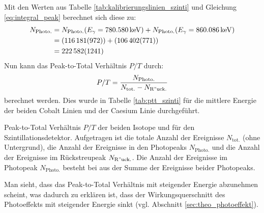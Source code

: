 \documentclass[11pt, a4paper]{article}
\numberwithin{equation}{section}
\newcommand{\co}{\isotope[60]{Co}}
\newcommand{\cs}{\isotope[137]{Cs}}
\begin{document}
Mit den Werten aus Tabelle \ref{tab:kalibrierungslinien_szinti} und Gleichung \eqref{eq:integral_peak} berechnet sich diese zu:
\begin{align*}
	N_\mathrm{Photo.} &= N_\mathrm{Photo.}(E_\gamma = \SI{780.580}{\kilo\electronvolt}) +  N_\mathrm{Photo.}(E_\gamma = \SI{860.086}{\kilo\electronvolt})\\
	&= (\num{116181 +- 972}) + (\num{106402 +- 771})\\
	&= \num{222582 +- 1241}
\end{align*}
Nun kann das Peak-to-Total Verhältnis $P/T$ durch:
\begin{align}
	\label{eq:ptt}
	P/T = \frac{N_\mathrm{Photo.}}{N_\mathrm{tot.} - N_\mathrm{R"uck.}}
\end{align}
berechnet werden.
Dies wurde in Tabelle \ref{tab:ptt_szinti} für die mittlere Energie der beiden Cobalt Linien und der Caesium Linie durchgeführt.
\begin{table}[ht]
	\centering
	\resizebox{\textwidth}{!}{
	
	}
	\caption{Peak-to-Total Verhältnis $P/T$ der beiden Isotope \co{} und \cs{} für den Szintillationsdetektor. Aufgetragen ist die totale Anzahl der Ereignisse $N_\mathrm{tot.}$ (ohne Untergrund), die Anzahl der Ereignisse in den Photopeaks $N_\mathrm{Photo.}$ und die Anzahl der Ereignisse im Rückstreupeak $N_\mathrm{R"uck.}$. Die Anzahl der Ereignisse im Photopeak $N_\mathrm{Photo.}$ besteht bei \co{} aus der Summe der Ereignisse beider Photopeaks.}
	\label{tab:ptt_szinti}
\end{table}
Man sieht, dass das Peak-to-Total Verhältnis mit steigender Energie abzunehmen scheint, was dadurch zu erklären ist, dass der Wirkungsquerschnitt des Photoeffekts mit steigender Energie sinkt (vgl. Abschnitt \ref{sec:theo_photoeffekt}).
\end{document}
